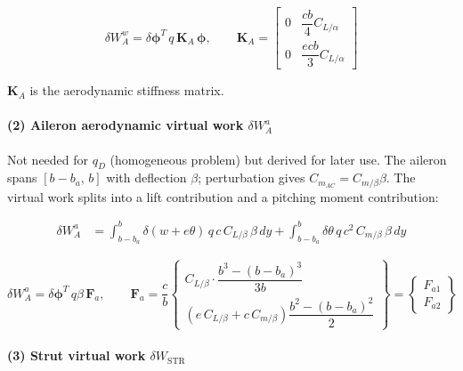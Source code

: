 \begin{equation}
\boxed{
\delta W_A^w = \delta\boldsymbol{\phi}^T\,q\,\mathbf{K}_A\,\boldsymbol{\phi}
}, \qquad
\mathbf{K}_A =
\begin{bmatrix}
0 & \dfrac{cb}{4}C_{L/\alpha} \\[6pt]
0 & \dfrac{ecb}{3}C_{L/\alpha}
\end{bmatrix}
\end{equation}

$\mathbf{K}_A$ is the aerodynamic stiffness matrix.


\paragraph{(2) Aileron aerodynamic virtual work $\delta W_A^a$}

Not needed for $q_D$ (homogeneous problem) but derived for later use. The aileron spans $[b-b_a,\,b]$
with deflection $\beta$; perturbation gives $C_{m_{AC}} = C_{m/\beta}\beta$. The virtual work splits into
a lift contribution and a pitching moment contribution:

\begin{align}
\delta W_A^a &= \int_{b-b_a}^{b} \delta(w+e\theta)\,q\,c\,C_{L/\beta}\,\beta\,dy
+ \int_{b-b_a}^{b} \delta\theta\,q\,c^2\,C_{m/\beta}\,\beta\,dy
\end{align}

\begin{equation}
    \label{eq:Fa}
\boxed{
\delta W_A^a = \delta\boldsymbol{\phi}^T\,q\beta\,\mathbf{F}_a
}, \qquad
\mathbf{F}_a = \frac{c}{b}
\begin{Bmatrix}
C_{L/\beta}\cdot\dfrac{b^3-(b-b_a)^3}{3b} \\[8pt]
\left(e\,C_{L/\beta}+c\,C_{m/\beta}\right)\dfrac{b^2-(b-b_a)^2}{2}
\end{Bmatrix} 
=\begin{Bmatrix}
F_{a1} \\
F_{a2}
\end{Bmatrix}
\end{equation}

\paragraph{(3) Strut virtual work $\delta W_{\mathrm{STR}}$}

